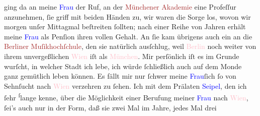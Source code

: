                ging da an meine \textcolor{blue}{Frau}{} der Ruf,
               an der \textcolor{brown}{Münchener Akademie}{}\ledrightnote{\textcolor{brown}{Akademie der Tonkunst}} eine Profeſſur anzunehmen,
               ſie griff mit beiden Händen zu, wir waren die Sorge los, wovon wir morgen unſer
               Mittagmal {\pb}beſtreiten ſollten; nach einer Reihe von
               Jahren erhält meine \textcolor{blue}{Frau}{} als
               Penſion ihren vollen Gehalt. An ſie kam übrigens auch ein \label{K_L02534_1v}\label{K_L02534_1h} an die \textcolor{brown}{Berliner Muſikhochſchule}{}\ledrightnote{\textcolor{brown}{Akademische Hochschule für Musik}},
               den sie natürlich ausſchlug, weil \textcolor{pink}{Berlin}{}\ledrightnote{\textcolor{pink}{Berlin}} noch weiter
               von ihrem unvergeßlichen \textcolor{pink}{Wien}{}\ledrightnote{\textcolor{pink}{Wien}} iſt als \textcolor{pink}{München}{}\ledrightnote{\textcolor{pink}{München}}. Mir perſönlich iſt es im Grunde wurſcht,
               in welcher Stadt ich lebe, ich würde ſchließlich auch auf dem Monde ganz gemütlich
               leben können. Es fällt mir nur ſchwer meine \textcolor{blue}{Frau}{}ſich ſo von Sehnſucht nach \textcolor{pink}{Wien}{}\ledrightnote{\textcolor{pink}{Wien}} verzehren zu ſehen. Ich \label{K_L02534_2v}\label{K_L02534_2h} mit dem
               Prälaten \textcolor{blue}{Seipel}{}\ledrightnote{\textcolor{blue}{Ignaz Seipel}}, den ich ſehr \substVorne{}\textsuperscript{ſ}\substDazwischen{}l\substHinten{}ange kenne, über die Möglichkeit einer Berufung meiner \textcolor{blue}{Frau}{} nach \textcolor{pink}{Wien}{}\ledrightnote{\textcolor{pink}{Wien}}, ſei’s auch nur in der Form, daß sie zwei Mal im Jahre, jedes Mal drei
